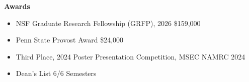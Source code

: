 \begin{center}
    \textbf{Awards}
\end{center}

\begin{itemize}[noitemsep, topsep=0pt, partopsep=0pt, parsep=0pt]
    \item NSF Graduate Research Fellowship (GRFP), 2026 \hfill \$159,000
    \item Penn State Provost Award \hfill \$24,000
    \item Third Place, 2024 Poster Presentation Competition, MSEC NAMRC 2024
    \item Dean's List 6/6 Semesters
\end{itemize}
